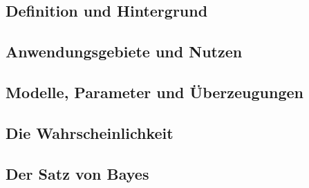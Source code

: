 
\subsection{Definition und Hintergrund}
\subsection{Anwendungsgebiete und Nutzen}
\subsection{Modelle, Parameter und Überzeugungen}
\subsection{Die Wahrscheinlichkeit}
\subsection{Der Satz von Bayes}


